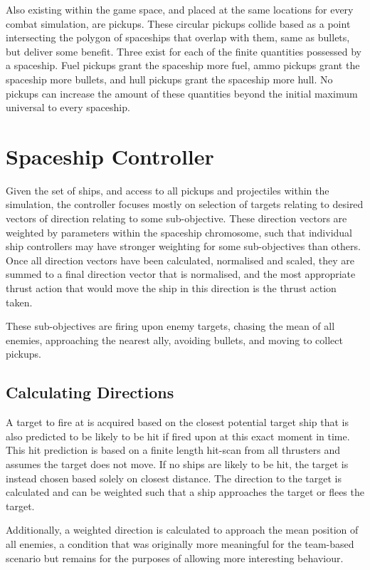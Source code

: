 \documentclass[a4paper]{article}
\begin{document}
Also existing within the game space, and placed at the same locations for every combat simulation, are pickups. These circular pickups collide based as a point intersecting the polygon of spaceships that overlap with them, same as bullets, but deliver some benefit. Three exist for each of the finite quantities possessed by a spaceship. Fuel pickups grant the spaceship more fuel, ammo pickups grant the spaceship more bullets, and hull pickups grant the spaceship more hull. No pickups can increase the amount of these quantities beyond the initial maximum universal to every spaceship.

\section{Spaceship Controller}

Given the set of ships, and access to all pickups and projectiles within the simulation, the controller focuses mostly on selection of targets relating to desired vectors of direction relating to some sub-objective. These direction vectors are weighted by parameters within the spaceship chromosome, such that individual ship controllers may have stronger weighting for some sub-objectives than others. Once all direction vectors have been calculated, normalised and scaled, they are summed to a final direction vector that is normalised, and the most appropriate thrust action that would move the ship in this direction is the thrust action taken.

These sub-objectives are firing upon enemy targets, chasing the mean of all enemies, approaching the nearest ally, avoiding bullets, and moving to collect pickups.

\subsection{Calculating Directions}

A target to fire at is acquired based on the closest potential target ship that is also predicted to be likely to be hit if fired upon at this exact moment in time. This hit prediction is based on a finite length hit-scan from all thrusters and assumes the target does not move. If no ships are likely to be hit, the target is instead chosen based solely on closest distance. The direction to the target is calculated and can be weighted such that a ship approaches the target or flees the target.

Additionally, a weighted direction is calculated to approach the mean position of all enemies, a condition that was originally more meaningful for the team-based scenario but remains for the purposes of allowing more interesting behaviour.
\end{document}
